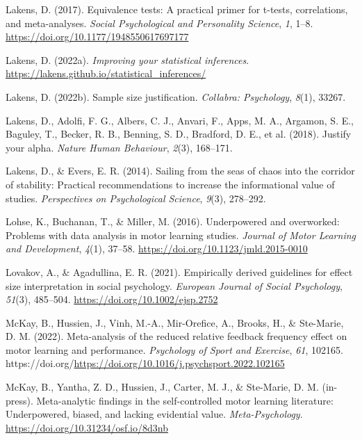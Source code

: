 \documentclass[
  doc, donotrepeattitle,floatsintext]{apa7}
\newlength{\cslhangindent}
\newlength{\cslentryspacingunit} %
\newenvironment{CSLReferences}[2] %
 {%
  \setlength{\parindent}{0pt}
  \ifodd #1
  \let\oldpar\par
  \def\par{\hangindent=\cslhangindent\oldpar}
  \fi
  \setlength{\parskip}{#2\cslentryspacingunit}
 }%
 {}
\begin{document}
\begin{CSLReferences}{1}{0}
\leavevmode{}%
Lakens, D. (2017). Equivalence tests: A practical primer for t-tests, correlations, and meta-analyses. \emph{Social Psychological and Personality Science}, \emph{1}, 1--8. \url{https://doi.org/10.1177/1948550617697177}

\leavevmode{}%
Lakens, D. (2022a). \emph{Improving your statistical inferences}. \url{https://lakens.github.io/statistical_inferences/}

\leavevmode{}%
Lakens, D. (2022b). Sample size justification. \emph{Collabra: Psychology}, \emph{8}(1), 33267.

\leavevmode{}%
Lakens, D., Adolfi, F. G., Albers, C. J., Anvari, F., Apps, M. A., Argamon, S. E., Baguley, T., Becker, R. B., Benning, S. D., Bradford, D. E., et al. (2018). Justify your alpha. \emph{Nature Human Behaviour}, \emph{2}(3), 168--171.

\leavevmode{}%
Lakens, D., \& Evers, E. R. (2014). Sailing from the seas of chaos into the corridor of stability: Practical recommendations to increase the informational value of studies. \emph{Perspectives on Psychological Science}, \emph{9}(3), 278--292.

\leavevmode{}%
Lohse, K., Buchanan, T., \& Miller, M. (2016). Underpowered and overworked: Problems with data analysis in motor learning studies. \emph{Journal of Motor Learning and Development}, \emph{4}(1), 37--58. \url{https://doi.org/10.1123/jmld.2015-0010}

\leavevmode{}%
Lovakov, A., \& Agadullina, E. R. (2021). Empirically derived guidelines for effect size interpretation in social psychology. \emph{European Journal of Social Psychology}, \emph{51}(3), 485--504. \url{https://doi.org/10.1002/ejsp.2752}

\leavevmode{}%
McKay, B., Hussien, J., Vinh, M.-A., Mir-Orefice, A., Brooks, H., \& Ste-Marie, D. M. (2022). Meta-analysis of the reduced relative feedback frequency effect on motor learning and performance. \emph{Psychology of Sport and Exercise}, \emph{61}, 102165. https://doi.org/\url{https://doi.org/10.1016/j.psychsport.2022.102165}

\leavevmode{}%
McKay, B., Yantha, Z. D., Hussien, J., Carter, M. J., \& Ste-Marie, D. M. (in-press). Meta-analytic findings in the self-controlled motor learning literature: {Underpowered}, biased, and lacking evidential value. \emph{Meta-Psychology}. \url{https://doi.org/10.31234/osf.io/8d3nb}


\end{CSLReferences}
\end{document}
